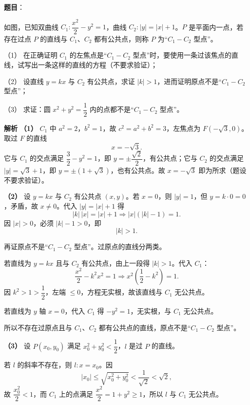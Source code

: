 \begin{answer}

\textbf{题目}：

如图，已知双曲线 $C_1:\dfrac{x^2}{2}-y^2=1$，曲线 $C_2:|y|=|x|+1$。$P$ 是平面内一点，若存在过点 $P$ 的直线与 $C_1$、$C_2$ 都有公共点，则称 $P$ 为“$C_1-C_2$ 型点”。
\nopagebreak[4]
\begin{center}\end{center}
\nopagebreak[4]
（1） 在正确证明 $C_1$ 的左焦点是“$C_1-C_2$ 型点”时，要使用一条过该焦点的直线，试写出一条这样的直线的方程（不要求验证）；

（2） 设直线 $y=kx$ 与 $C_2$ 有公共点，求证 $|k|>1$，进而证明原点不是“$C_1-C_2$ 型点”；

（3） 求证：圆 $x^2+y^2=\dfrac12$ 内的点都不是“$C_1-C_2$ 型点”。

\textbf{解析}
\textbf{（1）} $C_1$ 中 $a^2=2$，$b^2=1$，故 $c^2=a^2+b^2=3$，左焦点为 $F(-\sqrt3,0)$。取过 $F$ 的直线
\nopagebreak[4]
\[x=-\sqrt3.\]
它与 $C_1$ 的交点满足 $\dfrac32-y^2=1$，即 $y=\pm\dfrac{\sqrt2}2$，有公共点；它与 $C_2$ 的交点满足 $|y|=\sqrt3+1$，即 $y=\pm(1+\sqrt3)$，也有公共点。故 $x=-\sqrt3$ 即为所求（题设不要求验证）。

\textbf{（2）} 设 $y=kx$ 与 $C_2$ 有公共点 $(x,y)$。若 $x=0$，则 $|y|=1$，但 $y=k\cdot0=0$，矛盾，故 $x\neq0$。代入 $|y|=|x|+1$ 得
\nopagebreak[4]
\[|k|\,|x|=|x|+1\Longrightarrow |x|\left(|k|-1\right)=1.\]
因 $|x|>0$，必须 $|k|-1>0$，即
\nopagebreak[4]
\[|k|>1.\]

再证原点不是“$C_1-C_2$ 型点”。过原点的直线分两类。

若直线为 $y=kx$ 且与 $C_2$ 有公共点，由上一段得 $|k|>1$。代入 $C_1$：
\nopagebreak[4]
\[\frac{x^2}2-k^2x^2=1\Longrightarrow x^2\left(\frac12-k^2\right)=1.\]
因 $k^2>1>\dfrac12$，左端 $\leqslant0$，方程无实根，故该直线与 $C_1$ 无公共点。

若直线为 $y$ 轴 $x=0$，代入 $C_1$ 得 $-y^2=1$，无实根，与 $C_1$ 无公共点。

所以不存在过原点且与 $C_1$、$C_2$ 都有公共点的直线，原点不是“$C_1-C_2$ 型点”。

\textbf{（3）} 设 $P(x_0,y_0)$ 满足 $x_0^2+y_0^2<\dfrac12$，$l$ 是过 $P$ 的直线。

若 $l$ 的斜率不存在，则 $l:x=x_0$。因
\nopagebreak[4]
\[|x_0|\leqslant\sqrt{x_0^2+y_0^2}<\frac1{\sqrt2}<\sqrt2,\]
故 $\dfrac{x_0^2}2<1$，而 $C_1$ 上的点满足 $\dfrac{x^2}2=1+y^2\geqslant1$，所以 $l$ 与 $C_1$ 无公共点。


\end{answer}
